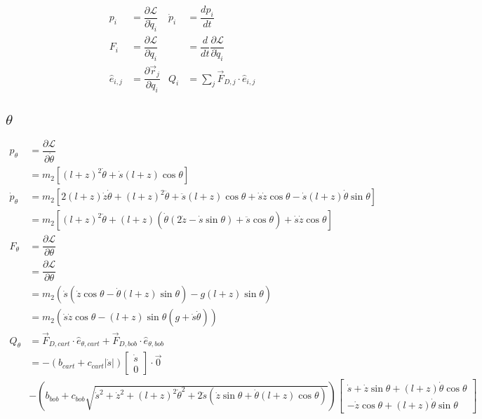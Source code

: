 \documentclass[12pt,a4paper,portrait]{article}
\newcommand{\lag}{\mathcal{L}}
\begin{document}
	\begin{align*}
		p_i &= \dfrac{\partial \lag}{\partial \dot{q}_i} & \dot{p}_i &= \dfrac{dp_i}{dt} \\
		F_i &= \dfrac{\partial \lag}{\partial q_i} & &= \dfrac{d}{dt}\dfrac{\partial \lag}{\partial \dot{q}_i}\\
		\hat{e}_{i,j} &= \dfrac{\partial \vec{r}_{j}}{\partial q_i} & Q_i &= \sum_{j} \vec{F}_{D, j} \cdot \hat{e}_{i,j}
	\end{align*}
	
	\subsection{$\theta$}
	\begin{align*}
		p_{\theta} &= \dfrac{\partial \lag}{\partial \dot{\theta}} \\
		&= m_2 \left[(l+z)^2 \dot{\theta} + \dot{s}(l+z)\cos{\theta}\right] \\
		\dot{p}_{\theta} &= m_2\left[2(l+z)\dot{z}\dot{\theta} + (l+z)^2\ddot{\theta} + \ddot{s}(l+z)\cos{\theta} + \dot{s}\dot{z}\cos{\theta} - \dot{s}(l+z)\dot{\theta}\sin{\theta}\right] \\
		&= m_2 \left[(l+z)^2 \ddot{\theta} + (l+z)\left(\dot{\theta}(2\dot{z} - \dot{s}\sin{\theta}) + \ddot{s}\cos{\theta}\right) + \dot{s}\dot{z}\cos{\theta}\right]\\
		F_{\theta} &= \dfrac{\partial \lag}{\partial \theta} \\
		&= \dfrac{\partial \lag}{\partial \theta} \\
		&= m_2(\dot{s}(\dot{z}\cos{\theta} - \dot{\theta}(l+z)\sin{\theta}) - g(l+z)\sin{\theta})\\
		&= m_2(\dot{s}\dot{z}\cos{\theta}-(l+z)\sin{\theta}(g+\dot{s}\dot{\theta})) \\
		Q_{\theta} &= \vec{F}_{D,cart} \cdot \hat{e}_{\theta,cart} + \vec{F}_{D,bob} \cdot \hat{e}_{\theta,bob} \\
		&= -(b_{cart}+c_{cart}|\dot{s}|)\begin{bmatrix}
			\dot{s}\\
			0
		\end{bmatrix} \cdot \vec{0}\\
		&-(b_{bob}+c_{bob}\sqrt{\dot{s}^2 + \dot{z}^2 + (l+z)^2\dot{\theta}^2 + 2\dot{s}(\dot{z}\sin{\theta} + \dot{\theta}(l+z)\cos{\theta})})\begin{bmatrix}
		\dot{s} + \dot{z}\sin{\theta} + (l+z)\dot{\theta}\cos{\theta} \\
		-\dot{z}\cos{\theta} + (l+z)\dot{\theta}\sin{\theta}

\end{bmatrix}
\end{align*}
\end{document}
